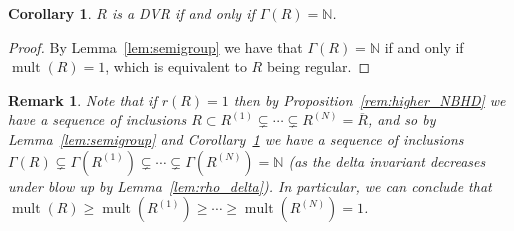 \documentclass{article}
\newtheorem{proposition}[theorem]{Proposition}
\newtheorem{remark}[theorem]{Remark}
\newtheorem{corollary}[theorem]{Corollary}
\DeclareMathOperator{\mult}{mult}
\numberwithin{theorem}{section}
\begin{document}




\begin{corollary}\label{Cor:DVR_Gamma}
    $R$ is a DVR if and only if $\Gamma(R)=\mathbb{N}$. 
\end{corollary}
\begin{proof}
    By Lemma~\ref{lem:semigroup} we have that $\Gamma(R)=\mathbb{N}$ if and only if $\mult(R)=1$, which is equivalent to $R$ being regular. 
\end{proof}

\begin{remark}
    \textup{Note that if $r(R)=1$ then by Proposition~\ref{rem:higher_NBHD} we have a sequence of inclusions $R \subset R^{(1)} \subsetneq \cdots \subsetneq R^{(N)} = \overline{R}$, and so by Lemma~\ref{lem:semigroup} and Corollary~\ref{Cor:DVR_Gamma}  we have a sequence of inclusions $\Gamma(R) \subsetneq \Gamma(R^{(1)}) \subsetneq \cdots \subsetneq \Gamma(R^{(N)}) = \mathbb{N}$ (as the delta invariant decreases under blow up by Lemma~\ref{lem:rho_delta}). In particular, we can conclude that $\mult(R) \geq \mult(R^{(1)}) \geq \cdots \geq \mult(R^{(N)}) = 1$. }
\end{remark}
\end{document}
